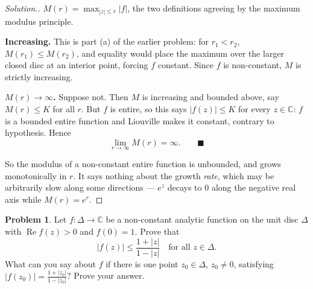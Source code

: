 \documentclass[11pt,a4paper]{article}
\theoremstyle{definition}
\newtheorem{problemx}{Problem}[section]
\newenvironment{problem}{\begin{problemx}}{\end{problemx}}
\newenvironment{solution}
  {\renewcommand{\qedsymbol}{}\begin{proof}[\textit{Solution}.]}
  {\end{proof}}
\begin{document}
\begin{solution}
$M(r) = \max_{\left|z\right| \leq r}\left|f\right|$, the two definitions agreeing
by the maximum modulus principle.

\textbf{Increasing.} This is part (a) of the earlier problem: for $r_1 < r_2$,
$M(r_1) \leq M(r_2)$, and equality would place the maximum over the larger closed
disc at an interior point, forcing $f$ constant. Since $f$ is non-constant, $M$ is
strictly increasing.

\textbf{$M(r) \rightarrow \infty$.} Suppose not. Then $M$ is increasing and bounded
above, say $M(r) \leq K$ for all $r$. But $f$ is entire, so this says
$\left|f(z)\right| \leq K$ for every $z \in \mathbb{C}$: $f$ is a bounded entire
function and Liouville makes it constant, contrary to hypothesis. Hence
$$\boxed{\lim_{r\to\infty} M(r) = \infty .} \qquad \blacksquare$$

So the modulus of a non-constant entire function is unbounded, and grows
monotonically in $r$. It says nothing about the growth \emph{rate}, which may be
arbitrarily slow along some directions --- $e^{z}$ decays to $0$ along the negative
real axis while $M(r) = e^{r}$.
\end{solution}


\begin{problem}
Let $f : \Delta \rightarrow \mathbb{C}$ be a non-constant analytic function on
the unit disc $\Delta$ with $\operatorname{Re}f(z) > 0$ and $f(0) = 1$. Prove
that
$$\left|f(z)\right| \leq \frac{1 + \left|z\right|}{1 - \left|z\right|}
\quad \text{for all } z \in \Delta .$$
What can you say about $f$ if there is one point $z_0 \in \Delta$, $z_0 \neq 0$,
satisfying
$\left|f(z_0)\right| = \frac{1 + \left|z_0\right|}{1 - \left|z_0\right|}$?
Prove your answer.
\end{problem}
\end{document}
